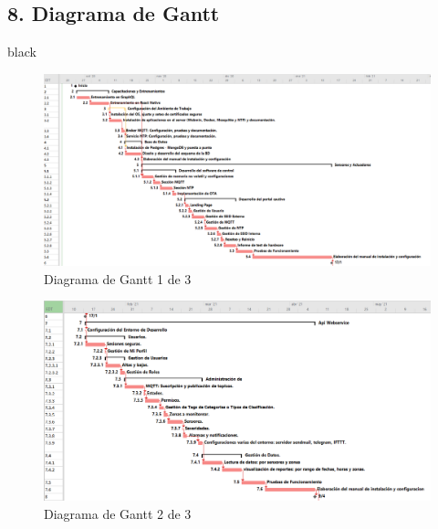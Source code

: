 \documentclass[11pt]{charter}
\begin{document}
\begin{landscape}
\section{8. Diagrama de Gantt}
\label{sec:gantt}

\begin{consigna}{black}

\vspace{5px}

\begin{figure}[htpb]
	\centering 
	\includegraphics[width=1.4\textwidth]{./Figuras/gantt01.png}
	\caption{Diagrama de Gantt 1 de 3}
	\label{fig:gantt01}
\end{figure}
\vspace{5px}
\newpage
\vspace*{2px}
\begin{figure}[htpb]
	\centering 
	\includegraphics[width=1.3\textwidth]{./Figuras/gantt02.png}
	\caption{Diagrama de Gantt 2 de 3}
	\label{fig:gantt02}
\end{figure}
\vspace{5px}
\newpage
\vspace*{2px}

\end{consigna}
\end{landscape}
\end{document}
